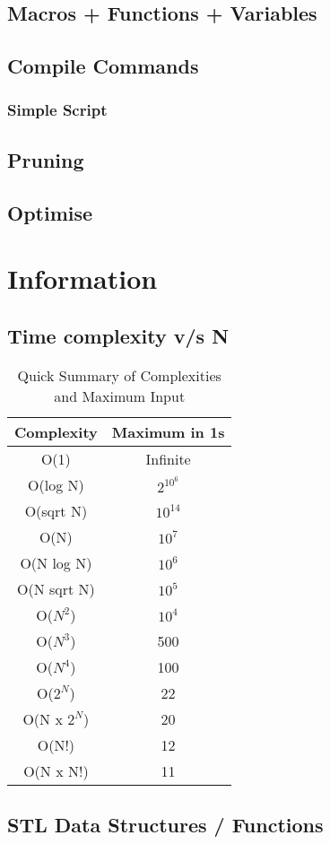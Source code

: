 \documentclass{article}
\begin{document}
\subsection{Macros + Functions + Variables}


\subsection{Compile Commands}

\subsubsection{Simple Script}


\subsection{Pruning}


\subsection{Optimise}


\section{Information}
\subsection{Time complexity v/s N}
\begin{table}[H]
\begin{tabular}{|c|c|}
\hline
Complexity     & Maximum in 1s \\ \hline
O(1)           & Infinite      \\ \hline
O(log N)       & $2^{10^{6}}$  \\ \hline
O(sqrt N)      & $10^{14}$     \\ \hline
O(N)           & $10^{7}$      \\ \hline
O(N log N)     & $10^{6}$      \\ \hline
O(N sqrt N)    & $10^{5}$      \\ \hline
O($N^{2}$)     & $10^{4}$      \\ \hline
O($N^{3}$)     & 500           \\ \hline
O($N^{4}$)     & 100           \\ \hline
O($2^{N}$)     & 22            \\ \hline
O(N x $2^{N}$) & 20            \\ \hline
O(N!)          & 12            \\ \hline
O(N x N!)      & 11            \\ \hline
\end{tabular}
\caption{Quick Summary of Complexities and Maximum Input}
\label{tab:complexity}
\end{table}

\subsection{STL Data Structures / Functions}

\end{document}
